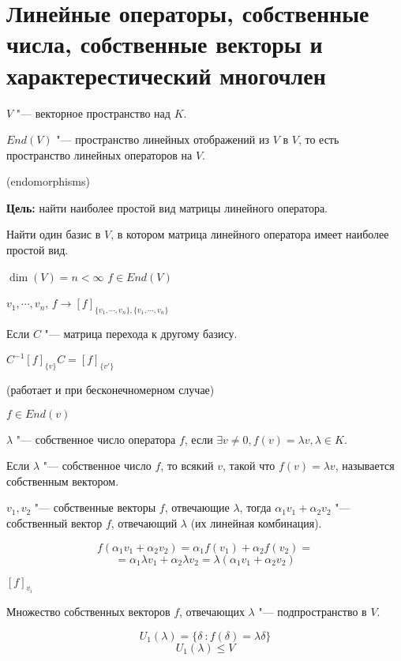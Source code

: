 \section{Линейные операторы, собственные числа, собственные векторы и 
характерестический многочлен}

$V$ "--- векторное пространство над $K$.

$End(V)$ "--- пространство линейных отображений из $V$ в $V$, 
то есть пространство линейных операторов на $V$.

(endomorphisms)

\textbf{Цель:} найти наиболее простой вид матрицы линейного оператора.

Найти один базис в $V$, в котором матрица линейного оператора имеет наиболее 
простой вид.

$\dim (V) = n < \infty$
$f \in End(V)$

$v_1, \cdots, v_n$, $f \to [f]_{\{v_1, \cdots, v_n\}, \{v_1, \cdots, v_n\}}$

Если $C$ "--- матрица перехода к другому базису. 

$C^{-1}[f]_{\{v\}}C = [f]_{\{v'\}}$

\begin{Def}
(работает и при бесконечномерном случае)

$f \in End(v)$

$\lambda$ "--- собственное число оператора $f$, если 
$\exists v \ne 0, f(v) = \lambda v, \lambda \in K$.
\end{Def}

\begin{Def}
   Если $\lambda$ "--- собственное число $f$, то всякий $v$, такой что $f(v) = \lambda v$, называется собственным
   вектором.
\end{Def}
\begin{Rem}
$v_1, v_2$ "--- собственные векторы $f$, отвечающие $\lambda$, тогда 
$\alpha_1 v_1 + \alpha_2 v_2$ "--- собственный вектор $f$, отвечающий $\lambda$
(их линейная комбинация).

$$f(\alpha_1 v_1 + \alpha_2 v_2) = \alpha_1 f(v_1) + \alpha_2 f(v_2) = $$
$$= \alpha_1 \lambda v_1 + \alpha_2 \lambda v_2 = \lambda(\alpha_1 v_1 + \alpha_2 v_2) $$

$[f]_{v_i}$
\end{Rem}

Множество собственных векторов $f$, отвечающих $\lambda$ "--- подпространство в $V$.

$$U_1(\lambda) = \{\delta\ \colon f(\delta) = \lambda \delta\} $$
$$U_1(\lambda) \le V$$

